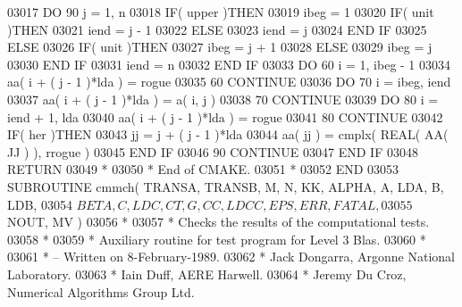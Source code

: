 \begin{DoxyCode}
03017          \textcolor{keywordflow}{DO} 90 j = 1, n
03018             \textcolor{keywordflow}{IF}( upper )\textcolor{keywordflow}{THEN}
03019                ibeg = 1
03020                \textcolor{keywordflow}{IF}( unit )\textcolor{keywordflow}{THEN}
03021                   iend = j - 1
03022                \textcolor{keywordflow}{ELSE}
03023                   iend = j
03024 \textcolor{keywordflow}{               END IF}
03025             \textcolor{keywordflow}{ELSE}
03026                \textcolor{keywordflow}{IF}( unit )\textcolor{keywordflow}{THEN}
03027                   ibeg = j + 1
03028                \textcolor{keywordflow}{ELSE}
03029                   ibeg = j
03030 \textcolor{keywordflow}{               END IF}
03031                iend = n
03032 \textcolor{keywordflow}{            END IF}
03033             \textcolor{keywordflow}{DO} 60 i = 1, ibeg - 1
03034                aa( i + ( j - 1 )*lda ) = rogue
03035    60       \textcolor{keywordflow}{CONTINUE}
03036             \textcolor{keywordflow}{DO} 70 i = ibeg, iend
03037                aa( i + ( j - 1 )*lda ) = a( i, j )
03038    70       \textcolor{keywordflow}{CONTINUE}
03039             \textcolor{keywordflow}{DO} 80 i = iend + 1, lda
03040                aa( i + ( j - 1 )*lda ) = rogue
03041    80       \textcolor{keywordflow}{CONTINUE}
03042             \textcolor{keywordflow}{IF}( her )\textcolor{keywordflow}{THEN}
03043                jj = j + ( j - 1 )*lda
03044                aa( jj ) = cmplx( \textcolor{keywordtype}{REAL( AA( JJ ) )}, rrogue )
03045 \textcolor{keywordflow}{            END IF}
03046    90    \textcolor{keywordflow}{CONTINUE}
03047 \textcolor{keywordflow}{      END IF}
03048       \textcolor{keywordflow}{RETURN}
03049 \textcolor{comment}{*}
03050 \textcolor{comment}{*     End of CMAKE.}
03051 \textcolor{comment}{*}
03052 \textcolor{keyword}{      END}
03053 \textcolor{keyword}{      SUBROUTINE }cmmch( TRANSA, TRANSB, M, N, KK, ALPHA, A, LDA, B, LDB,
03054      $                  BETA, C, LDC, CT, G, CC, LDCC, EPS, ERR, FATAL,
03055      $                  NOUT, MV )
03056 \textcolor{comment}{*}
03057 \textcolor{comment}{*  Checks the results of the computational tests.}
03058 \textcolor{comment}{*}
03059 \textcolor{comment}{*  Auxiliary routine for test program for Level 3 Blas.}
03060 \textcolor{comment}{*}
03061 \textcolor{comment}{*  -- Written on 8-February-1989.}
03062 \textcolor{comment}{*     Jack Dongarra, Argonne National Laboratory.}
03063 \textcolor{comment}{*     Iain Duff, AERE Harwell.}
03064 \textcolor{comment}{*     Jeremy Du Croz, Numerical Algorithms Group Ltd.}

\end{DoxyCode}
